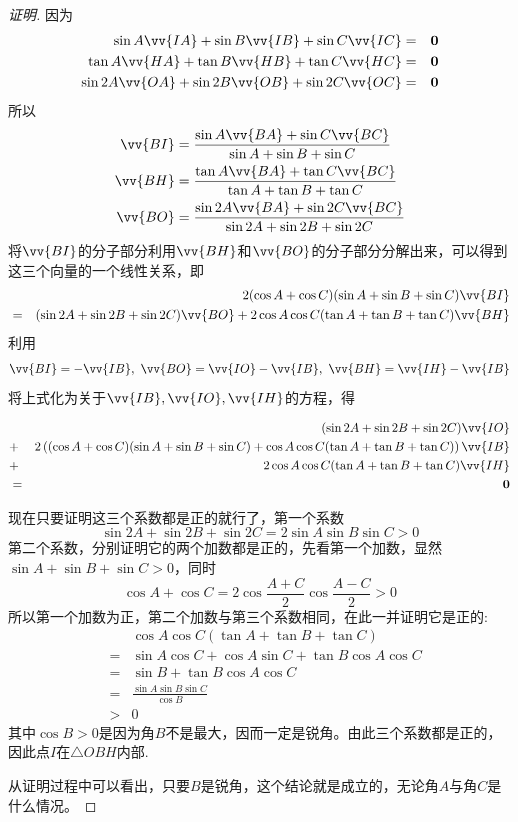 \begin{proof}[证明]
  因为
  \begin{eqnarray*}
    \sin{A} \vv{IA} + \sin{B} \vv{IB} + \sin{C} \vv{IC} & = & \bm{0} \\
    \tan{A} \vv{HA} + \tan{B} \vv{HB} + \tan{C} \vv{HC} & = & \bm{0} \\
    \sin{2A} \vv{OA} + \sin{2B} \vv{OB} + \sin{2C} \vv{OC} & = & \bm{0} 
  \end{eqnarray*}
  所以
  \begin{align*}
    \vv{BI} & = \frac{\sin{A} \vv{BA} +\sin{C} \vv{BC}}{\sin{A}+\sin{B}+\sin{C}} \\
    \vv{BH} & = \frac{\tan{A} \vv{BA} +\tan{C} \vv{BC}}{\tan{A}+\tan{B}+\tan{C}}  \\
    \vv{BO} & = \frac{\sin{2A} \vv{BA} +\sin{2C} \vv{BC}}{\sin{2A}+\sin{2B}+\sin{2C}} 
  \end{align*}
  将$\vv{BI}$的分子部分利用$\vv{BH}$和$\vv{BO}$的分子部分分解出来，可以得到这三个向量的一个线性关系，即
  \begin{eqnarray*}
    & & 2(\cos{A}+\cos{C})(\sin{A}+\sin{B}+\sin{C}) \vv{BI} \\
    &=& (\sin{2A}+\sin{2B}+\sin{2C}) \vv{BO} + 2\cos{A}\cos{C}(\tan{A}+\tan{B}+\tan{C}) \vv{BH}
  \end{eqnarray*}
  利用
  \[ \vv{BI}=-\vv{IB}, \  \vv{BO}=\vv{IO}-\vv{IB}, \  \vv{BH}=\vv{IH}-\vv{IB} \]
  将上式化为关于$\vv{IB},\vv{IO},\vv{IH}$的方程，得
  \begin{small}
  \begin{eqnarray*}
    && (\sin{2A}+\sin{2B}+\sin{2C}) \vv{IO} \\
    & + & 2\left((\cos{A}+\cos{C})(\sin{A}+\sin{B}+\sin{C})+\cos{A}\cos{C}(\tan{A}+\tan{B}+\tan{C})\right)\vv{IB}\\
    & + & 2 \cos{A}\cos{C}(\tan{A}+\tan{B}+\tan{C}) \vv{IH} \\
    & = & \bm{0}
  \end{eqnarray*}
  \end{small}
  现在只要证明这三个系数都是正的就行了，第一个系数
  \[ \sin{2A}+\sin{2B}+\sin{2C} = 2\sin{A}\sin{B}\sin{C} > 0 \]
  第二个系数，分别证明它的两个加数都是正的，先看第一个加数，显然$\sin{A}+\sin{B}+\sin{C}>0$，同时
  \[ \cos{A}+\cos{C}=2\cos{\frac{A+C}{2}}\cos{\frac{A-C}{2}}>0 \]
  所以第一个加数为正，第二个加数与第三个系数相同，在此一并证明它是正的:
  \begin{eqnarray*}
    && \cos{A}\cos{C}(\tan{A}+\tan{B}+\tan{C})  \\
    &= & \sin{A}\cos{C}+\cos{A}\sin{C}+\tan{B}\cos{A}\cos{C} \\
    &= & \sin{B} + \tan{B}\cos{A}\cos{C} \\
    &= & \frac{\sin{A}\sin{B}\sin{C}}{\cos{B}} \\
    &> & 0
  \end{eqnarray*}
  其中$\cos{B}>0$是因为角$B$不是最大，因而一定是锐角。由此三个系数都是正的，因此点$I$在$\triangle OBH$内部.

  从证明过程中可以看出，只要$B$是锐角，这个结论就是成立的，无论角$A$与角$C$是什么情况。
\end{proof}




